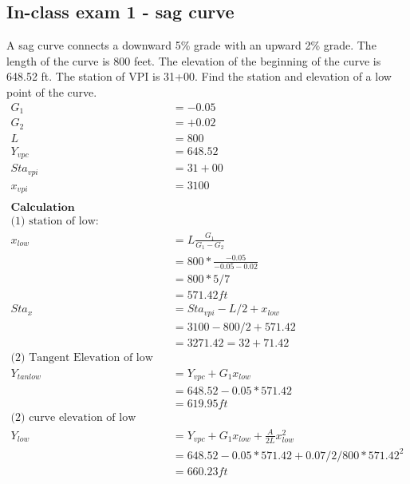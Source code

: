 \documentclass{article}
\begin{document}
  \subsection{In-class exam 1 - sag curve}
  A sag curve connects a downward 5\% grade with an upward 2\% grade.  The length of the curve is 800 feet.  The elevation of the beginning of the curve is 648.52 ft.  The station of VPI is 31+00.  Find the station and elevation of a low point of the curve.
  \\
  \begin{align*}
    G_1 & = -0.05 \\
    G_2 & = +0.02 \\
    L & = 800 \\
    Y_{vpc} & = 648.52 \\
    Sta_{vpi} & = 31+00 \\
    x_{vpi} & = 3100 \\
    \\
    \textbf{Calculation}\\
    \text{(1) station of low:} \\
    x_{low} & = L \frac{G_1}{G_1 - G_2} \\
            & = 800 * \frac{-0.05}{-0.05 - 0.02} \\
            & = 800 * 5 / 7 \\
            & = 571.42 ft \\
    Sta_x & = Sta_{vpi} - L/2 + x_{low} \\
          & = 3100 - 800/2 + 571.42 \\
          & = 3271.42 = 32+71.42 \\
    \text{(2) Tangent Elevation of low point:} \\
    Y_{tan low} & = Y_{vpc} + G_1x_{low} \\
              & = 648.52 -0.05 * 571.42 \\
              & = 619.95 ft\\
    \text{(2) curve elevation of low point:} \\
    Y_{low} & = Y_{vpc} + G_1x_{low} + \frac{A}{2L}x_{low}^2 \\
            & = 648.52 -0.05 * 571.42 + 0.07/2/800*571.42^2\\
            & = 660.23 ft\\
  \end{align*}

  \newpage
\end{document}

